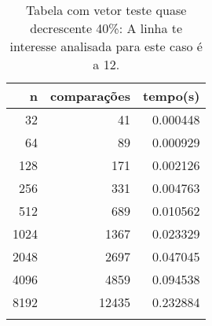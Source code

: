\begin{table}[ht]
\centering
\begin{tabular}{rrr} \toprule
        n &    comparações &       tempo(s) \\ \midrule
      32  &             41 &      0.000448 \\
      64  &             89 &      0.000929 \\
     128  &            171 &      0.002126 \\
     256  &            331 &      0.004763 \\
     512  &            689 &      0.010562 \\
    1024  &           1367 &      0.023329 \\
    2048  &           2697 &      0.047045 \\
    4096  &           4859 &      0.094538 \\
    8192  &          12435 &      0.232884 \\
\bottomrule\addlinespace
\end{tabular}
\caption{Tabela com vetor teste quase decrescente 40\%: A linha te interesse analisada para este caso é a 12.}
\label{tab:quicksortQuaseDecresc40}
\end{table}
